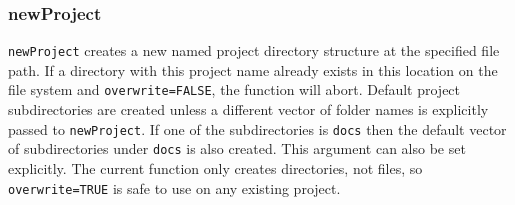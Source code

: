 \documentclass{article}\usepackage[]{graphicx}\usepackage[]{color}
\begin{document}
\title{}
\author{}
\maketitle





\subsubsection{newProject}
\texttt{newProject} creates a new named project directory structure at the specified file path.
If a directory with this project name already exists in this location on the file system and \texttt{overwrite=FALSE}, the function will abort.
Default project subdirectories are created unless a different vector of folder names is explicitly passed to \texttt{newProject}.
If one of the subdirectories is \texttt{docs} then the default vector of subdirectories under \texttt{docs} is also created.
This argument can also be set explicitly.
The current function only creates directories, not files, so \texttt{overwrite=TRUE} is safe to use on any existing project.
\end{document}
